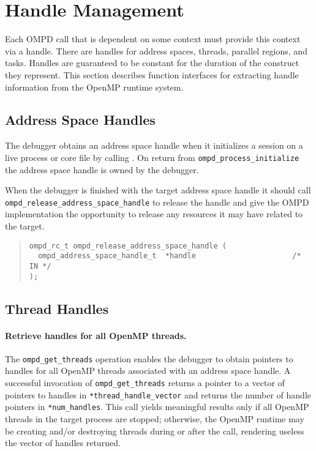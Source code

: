\section{Handle Management}

Each OMPD call that is dependent on some context must provide this
context via a handle.
There are handles for address spaces, threads, parallel regions, and tasks.
Handles are guaranteed to be constant for the
duration of the construct they represent.
This section describes function interfaces for extracting
handle information from the OpenMP runtime system.

\subsection{Address Space Handles}

The debugger obtains an address space handle when it initializes
a session on a live process or core file by calling
.
On return from \verb|ompd_process_initialize| the address
space handle is owned by the debugger.

When the debugger is finished with the target address space handle it
should call \texttt{ompd\_release\_address\_space\_handle} to release
the handle and give the OMPD implementation the opportunity to release
any resources it may have related to the target.

\begin{quote}
\begin{lstlisting}
ompd_rc_t ompd_release_address_space_handle (
  ompd_address_space_handle_t  *handle                      /* IN */
);
\end{lstlisting}
\end{quote}


\subsection{Thread Handles}

\paragraph{Retrieve handles for all OpenMP threads.}
The \verb|ompd_get_threads| operation enables the debugger
to obtain pointers to handles for all OpenMP threads associated
with an address space handle.
A successful invocation of  \verb|ompd_get_threads| returns
a pointer to a vector of pointers to handles in \verb|*thread_handle_vector|
and returns the number of handle pointers in \verb|*num_handles|.
This call yields meaningful results only if all OpenMP threads in
the target process are stopped;
otherwise, the OpenMP runtime may be creating and/or destroying
threads during or after the call, rendering useless the
vector of handles returned.

